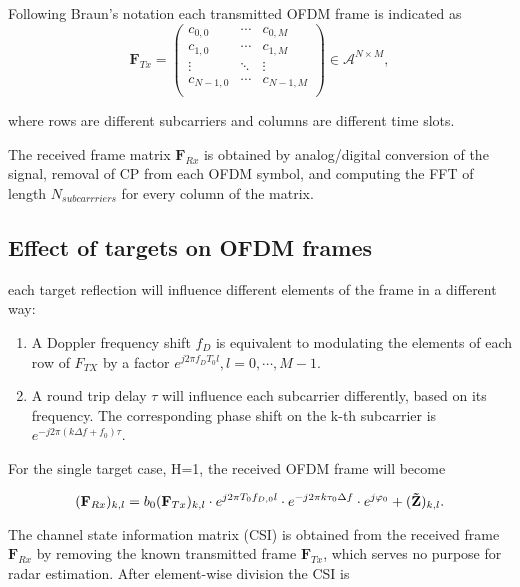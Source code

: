     Following Braun's notation each transmitted OFDM frame is indicated as
    \begin{equation}
        \mathbf F_{Tx} = \begin{pmatrix}
            c_{0,0} & \cdots & c_{0,M} \\
            c_{1,0} & \cdots & c_{1,M} \\
            \vdots   & \ddots & \vdots \\
            c_{N-1, 0} & \cdots & c_{N-1, M} \\
        \end{pmatrix} \in \mathcal{A}^{N\times M},
    \end{equation}
    
    where rows are different subcarriers and columns are different time slots.
    
    The received frame matrix $\mathbf F_{Rx}$ is obtained by analog/digital conversion of the signal, removal of CP from each OFDM symbol, and computing the FFT of length $N_{subcarrriers}$ for every column of the matrix.
    
    \subsection{Effect of targets on OFDM frames}
    each target reflection will influence different elements of the frame in a different way:
    
    \begin{enumerate}
        \item A Doppler frequency shift $f_D$ is equivalent to modulating the elements of each row of $F_{TX}$ by a factor $e^{j2\pi f_D T_0 l}, l = 0, \cdots, M-1$.
        \item A round trip delay $\tau$ will influence each subcarrier differently, based on its frequency. The corresponding phase shift on the k-th subcarrier is $e^{-j2\pi (k\Delta f + f_0)\tau}$.
    \end{enumerate}
    
    For the single target case, H=1, the received OFDM frame will become
    
    \begin{equation}
        (\mathbf F_{Rx})_{k,l} = b_0(\mathbf F_{Tx})_{k,l} \cdot e^{j2\pi T_0 f_{D,0} l}\cdot e^{-j2\pi k \tau_0 \Delta f} \cdot e^{j\varphi_0} + (\mathbf{\Tilde{Z}})_{k,l}.
    \end{equation}
    
    The channel state information matrix (CSI) is obtained from the received frame $\mathbf{F}_{Rx}$ by removing the known transmitted frame $\mathbf{F}_{Tx}$, which serves no purpose for radar estimation. After element-wise division the CSI is
    

